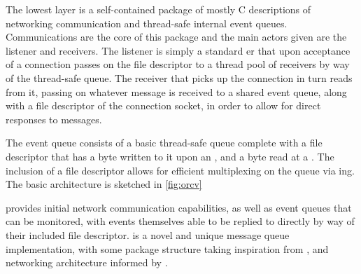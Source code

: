 The lowest layer is a self-contained package of mostly C descriptions of networking communication and thread-safe internal event queues.
Communications are the core of this package and the main actors given are the listener and receivers.
The listener is simply a standard er that upon acceptance of a connection passes on the file descriptor to a thread pool of receivers by way of the thread-safe queue.
The receiver that picks up the connection in turn reads from it, passing on whatever message is received to a shared event queue, along with a file descriptor of the connection socket, in order to allow for direct responses to messages.

The event queue consists of a basic thread-safe queue complete with a file descriptor that has a byte written to it upon an , and a byte read at a .
The inclusion of a file descriptor allows for efficient multiplexing on the queue via ing.
The basic architecture is sketched in \cref{fig:orcv}

\begin{sidewaysfigure} \centering  \caption{\label{fig:orcv}orcv architectural sketch.
	}
\end{sidewaysfigure}

\orcv{} provides initial network communication capabilities, as well as event queues that can be monitored, with events themselves able to be replied to directly by way of their included file descriptor.
\orcv{} is a novel and unique \R{} message queue implementation, with some package structure taking inspiration from \textcite{osrv}, and networking architecture informed by \textcite{stevens1997network}.
